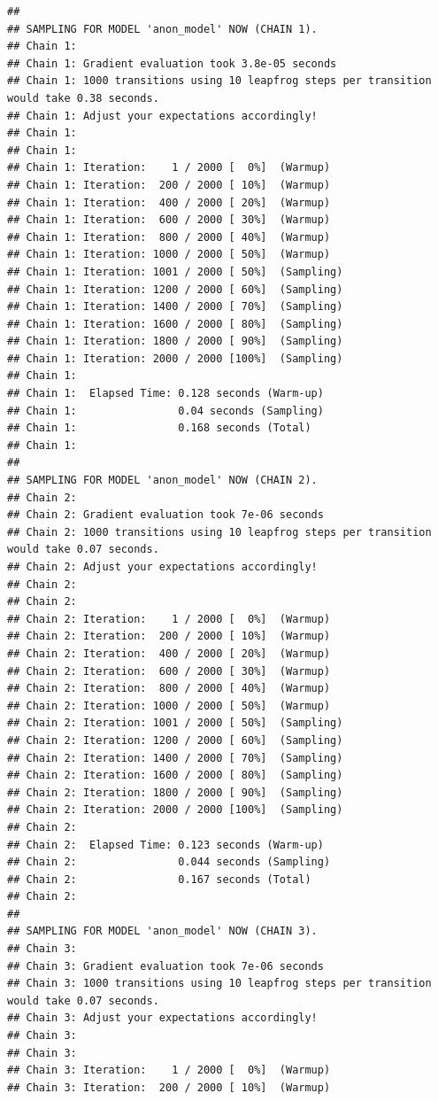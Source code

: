 \documentclass[
]{article}
\begin{document}
\begin{verbatim}
## 
## SAMPLING FOR MODEL 'anon_model' NOW (CHAIN 1).
## Chain 1: 
## Chain 1: Gradient evaluation took 3.8e-05 seconds
## Chain 1: 1000 transitions using 10 leapfrog steps per transition would take 0.38 seconds.
## Chain 1: Adjust your expectations accordingly!
## Chain 1: 
## Chain 1: 
## Chain 1: Iteration:    1 / 2000 [  0%]  (Warmup)
## Chain 1: Iteration:  200 / 2000 [ 10%]  (Warmup)
## Chain 1: Iteration:  400 / 2000 [ 20%]  (Warmup)
## Chain 1: Iteration:  600 / 2000 [ 30%]  (Warmup)
## Chain 1: Iteration:  800 / 2000 [ 40%]  (Warmup)
## Chain 1: Iteration: 1000 / 2000 [ 50%]  (Warmup)
## Chain 1: Iteration: 1001 / 2000 [ 50%]  (Sampling)
## Chain 1: Iteration: 1200 / 2000 [ 60%]  (Sampling)
## Chain 1: Iteration: 1400 / 2000 [ 70%]  (Sampling)
## Chain 1: Iteration: 1600 / 2000 [ 80%]  (Sampling)
## Chain 1: Iteration: 1800 / 2000 [ 90%]  (Sampling)
## Chain 1: Iteration: 2000 / 2000 [100%]  (Sampling)
## Chain 1: 
## Chain 1:  Elapsed Time: 0.128 seconds (Warm-up)
## Chain 1:                0.04 seconds (Sampling)
## Chain 1:                0.168 seconds (Total)
## Chain 1: 
## 
## SAMPLING FOR MODEL 'anon_model' NOW (CHAIN 2).
## Chain 2: 
## Chain 2: Gradient evaluation took 7e-06 seconds
## Chain 2: 1000 transitions using 10 leapfrog steps per transition would take 0.07 seconds.
## Chain 2: Adjust your expectations accordingly!
## Chain 2: 
## Chain 2: 
## Chain 2: Iteration:    1 / 2000 [  0%]  (Warmup)
## Chain 2: Iteration:  200 / 2000 [ 10%]  (Warmup)
## Chain 2: Iteration:  400 / 2000 [ 20%]  (Warmup)
## Chain 2: Iteration:  600 / 2000 [ 30%]  (Warmup)
## Chain 2: Iteration:  800 / 2000 [ 40%]  (Warmup)
## Chain 2: Iteration: 1000 / 2000 [ 50%]  (Warmup)
## Chain 2: Iteration: 1001 / 2000 [ 50%]  (Sampling)
## Chain 2: Iteration: 1200 / 2000 [ 60%]  (Sampling)
## Chain 2: Iteration: 1400 / 2000 [ 70%]  (Sampling)
## Chain 2: Iteration: 1600 / 2000 [ 80%]  (Sampling)
## Chain 2: Iteration: 1800 / 2000 [ 90%]  (Sampling)
## Chain 2: Iteration: 2000 / 2000 [100%]  (Sampling)
## Chain 2: 
## Chain 2:  Elapsed Time: 0.123 seconds (Warm-up)
## Chain 2:                0.044 seconds (Sampling)
## Chain 2:                0.167 seconds (Total)
## Chain 2: 
## 
## SAMPLING FOR MODEL 'anon_model' NOW (CHAIN 3).
## Chain 3: 
## Chain 3: Gradient evaluation took 7e-06 seconds
## Chain 3: 1000 transitions using 10 leapfrog steps per transition would take 0.07 seconds.
## Chain 3: Adjust your expectations accordingly!
## Chain 3: 
## Chain 3: 
## Chain 3: Iteration:    1 / 2000 [  0%]  (Warmup)
## Chain 3: Iteration:  200 / 2000 [ 10%]  (Warmup)

\end{verbatim}
\end{document}
